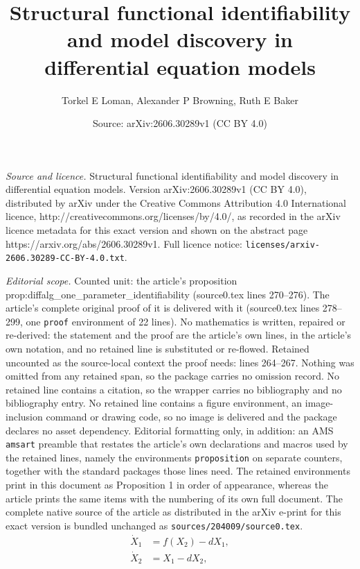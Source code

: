 \documentclass[10pt,a4paper]{amsart}
\title{Structural functional identifiability and model discovery in \\ differential equation models}
\author{Torkel E Loman, Alexander P Browning, Ruth E Baker}
\date{Source: arXiv:2606.30289v1 (CC BY 4.0)}
\begin{document}
\maketitle

\noindent\emph{Source and licence.} Structural functional identifiability and model discovery in \\ differential equation models. Version arXiv:2606.30289v1 (CC BY 4.0), distributed by arXiv under the Creative Commons Attribution 4.0 International licence, http://creativecommons.org/licenses/by/4.0/, as recorded in the arXiv licence metadata for this exact version and shown on the abstract page https://arxiv.org/abs/2606.30289v1. Full licence notice: \texttt{licenses/arxiv-2606.30289-CC-BY-4.0.txt}.\par\smallskip

\noindent\textit{Editorial scope.} Counted unit: the article's proposition prop:diffalg\_one\_parameter\_identifiability (source0.tex lines 270--276). The article's complete original proof of it is delivered with it (source0.tex lines 278--299, one \texttt{proof} environment of 22 lines). No mathematics is written, repaired or re-derived: the statement and the proof are the article's own lines, in the article's own notation, and no retained line is substituted or re-flowed.  Retained uncounted as the source-local context the proof needs: lines 264--267.  Nothing was omitted from any retained span, so the package carries no omission record.  No retained line contains a citation, so the wrapper carries no bibliography and no bibliography entry.  No retained line contains a figure environment, an image-inclusion command or drawing code, so no image is delivered and the package declares no asset dependency.  Editorial formatting only, in addition: an AMS \texttt{amsart} preamble that restates the article's own declarations and macros used by the retained lines, namely the environments \texttt{proposition} on separate counters, together with the standard packages those lines need.  The retained environments print in this document as Proposition 1 in order of appearance, whereas the article prints the same items with the numbering of its own full document.  The complete native source of the article as distributed in the arXiv e-print for this exact version is bundled unchanged as \texttt{sources/204009/source0.tex}.
\begin{align}
    \dot{X}_1 &= f(X_2) - dX_1, \label{eq:diffalg_model1_dXdt} \\
    \dot{X}_2 &= X_1 - dX_2,   \label{eq:diffalg_model1_dYdt}
\end{align}
\end{document}
